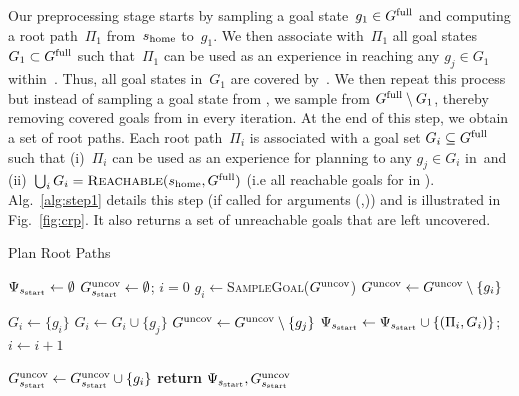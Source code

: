 \documentclass[conference]{IEEEtran}
\begin{document}
Our preprocessing stage starts by sampling a goal state~$g_1 \in G^{\textrm{full}}$ and computing a root path~$\Pi_1$ from~$s_{\textrm{home}}$ to~$g_1$. We then associate with~$\Pi_1$ all goal states~$G_1 \subset G^{\textrm{full}}$ such that~$\Pi_1$ can be used as an experience in reaching any $g_j \in G_1$ within~\Tbound.
Thus, all goal states in~$G_1$ are covered by~\Shome.
%
We then repeat this process but instead of sampling  a goal state from \Gfull, we sample from $G^{\textrm{full}} \setminus G_1$, thereby removing covered goals from \Gfull in every iteration.
At the end of this step, we obtain a set of root paths. 
Each root path~$\Pi_i$ is associated with a goal set $G_i \subseteq G^{\textrm{full}}$ such that 
(i)~$\Pi_i$ can be used as an experience for planning to any $g_j \in G_i$ in~\Tbound and 
(ii)~$\bigcup_i G_i = \textsc{Reachable}(s_{\textrm{home}}, G^{\textrm{full}})$ (i.e all reachable goals for \Shome in \Gfull).
%
Alg.~\ref{alg:step1} details this step (if called for arguments (\Shome,\Gfull)) and is illustrated in Fig.~\ref{fig:crp}. It also returns a set of unreachable goals that are left uncovered.




\begin{algorithm}[t]
\caption{Plan Root Paths}
\label{alg:step1}
    \AlgFontSize
\begin{algorithmic}[1]
\State $\Psi_{s_{\textrm{start}}} \leftarrow \emptyset$   
\State $G^{\textrm{uncov}}_{s_{\textrm{start}}} \leftarrow \emptyset$; \hspace{3mm}
       $i = 0$
\While{$\Guncov \neq \emptyset$}
    \State $g_i \leftarrow$\textsc{SampleGoal}($G^{\textrm{uncov}}$)
    \State $G^{\textrm{uncov}} \leftarrow G^{\textrm{uncov}} \setminus \{g_i\}$
    
     
        \State $G_i \leftarrow \{ g_i \}$	
                \State $G_i \leftarrow G_i \cup \{g_j\}$
                \State $G^{\textrm{uncov}} \leftarrow G^{\textrm{uncov}} \setminus \{g_j\}$
            \EndIf
        \EndFor
        \State $\Psi_{s_{\textrm{start}}} \leftarrow \Psi_{s_{\textrm{start}}} \cup \{ (\Pi_i, G_i)\}$; \hspace{3mm}
        $i \leftarrow i + 1$
        
    \Else
        \State $G^{\textrm{uncov}}_{s_{\textrm{start}}} \leftarrow G^{\textrm{uncov}}_{s_{\textrm{start}}} \cup \{g_i\}$ 
    \EndIf
\EndWhile
\State \textbf{return} $\Psi_{s_{\textrm{start}}}, G^{\textrm{uncov}}_{s_{\textrm{start}}}$
\EndProcedure
\end{algorithmic}
\end{algorithm}
\end{document}
